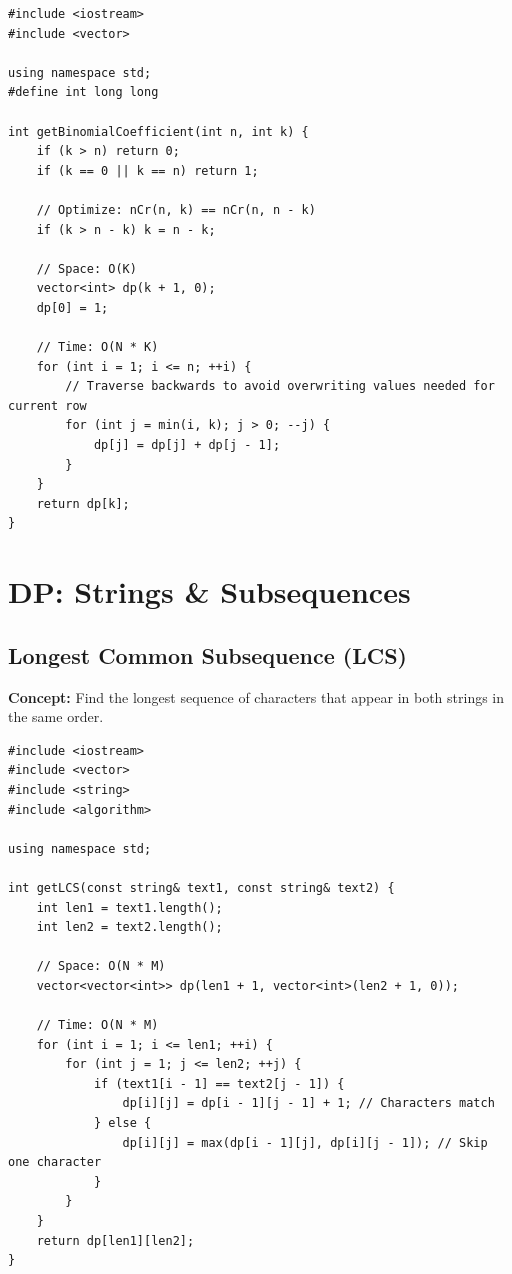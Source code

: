 \begin{lstlisting}
#include <iostream>
#include <vector>

using namespace std;
#define int long long

int getBinomialCoefficient(int n, int k) {
    if (k > n) return 0;
    if (k == 0 || k == n) return 1;
    
    // Optimize: nCr(n, k) == nCr(n, n - k)
    if (k > n - k) k = n - k;
    
    // Space: O(K)
    vector<int> dp(k + 1, 0);
    dp[0] = 1;
    
    // Time: O(N * K)
    for (int i = 1; i <= n; ++i) {
        // Traverse backwards to avoid overwriting values needed for current row
        for (int j = min(i, k); j > 0; --j) {
            dp[j] = dp[j] + dp[j - 1];
        }
    }
    return dp[k];
}
\end{lstlisting}




\section{DP: Strings \& Subsequences}

\subsection{Longest Common Subsequence (LCS)}
\textbf{Concept:} Find the longest sequence of characters that appear in both strings in the same order.

\begin{lstlisting}
#include <iostream>
#include <vector>
#include <string>
#include <algorithm>

using namespace std;

int getLCS(const string& text1, const string& text2) {
    int len1 = text1.length();
    int len2 = text2.length();
    
    // Space: O(N * M)
    vector<vector<int>> dp(len1 + 1, vector<int>(len2 + 1, 0));
    
    // Time: O(N * M)
    for (int i = 1; i <= len1; ++i) {
        for (int j = 1; j <= len2; ++j) {
            if (text1[i - 1] == text2[j - 1]) {
                dp[i][j] = dp[i - 1][j - 1] + 1; // Characters match
            } else {
                dp[i][j] = max(dp[i - 1][j], dp[i][j - 1]); // Skip one character
            }
        }
    }
    return dp[len1][len2];
}
\end{lstlisting}


